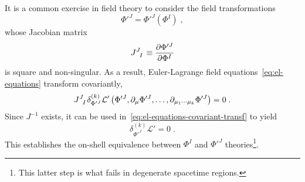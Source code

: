 \documentclass[../../main.tex]{subfiles}
\begin{document}
It is a common exercise in field theory to consider the field transformations
\begin{equation}
  \label{eq:standard-field-transf}
  \Phi'^{J}=\Phi'^{J} \left(\Phi^I\right) \;,
\end{equation}
whose Jacobian matrix
\begin{equation}
  \tensor{J}{^{J}_I} \equiv \frac{\partial \Phi'^{J}}{\partial \Phi^I}
\end{equation}
is square and non-singular. As a result, Euler-Lagrange field equations~\eqref{eq:el-equations} transform covariantly,
\begin{equation}
  \label{eq:el-equations-covariant-transf}
  \tensor{J}{^J_I}\delta^{(k)}_{\Phi'^{J}}\mathcal{L}'\left(\Phi'^{J}, \partial_\mu \Phi'^{J}, \ldots , \partial_{\mu_1\cdots\mu_k} \Phi'^{J}\right) = 0 \;.
\end{equation}
Since $J^{-1}$ exists, it can be used in~\eqref{eq:el-equations-covariant-transf} to yield
\begin{equation}
  \label{eq:el-equation-prime}
  \delta^{(k)}_{\Phi'^{J}}\mathcal{L}'=0 \;.
\end{equation}
This establishes the on-shell equivalence between $\Phi^I$ and $\Phi'^{J}$ theories\footnote{This latter step is what fails in degenerate spacetime regions.}.
\end{document}
